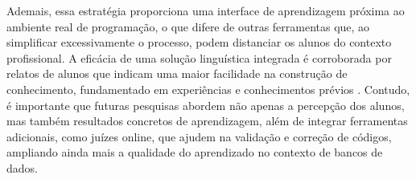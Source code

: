 Ademais, essa estratégia proporciona uma interface de aprendizagem próxima ao ambiente real de programação, o que difere de outras ferramentas que, ao simplificar excessivamente o processo, podem distanciar os alunos do contexto profissional. A eficácia de uma solução linguística integrada é corroborada por relatos de alunos que indicam uma maior facilidade na construção de conhecimento, fundamentado em experiências e conhecimentos prévios \cite{ImpactCalango2020}. Contudo, é importante que futuras pesquisas abordem não apenas a percepção dos alunos, mas também resultados concretos de aprendizagem, além de integrar ferramentas adicionais, como juízes online, que ajudem na validação e correção de códigos, ampliando ainda mais a qualidade do aprendizado no contexto de bancos de dados.

